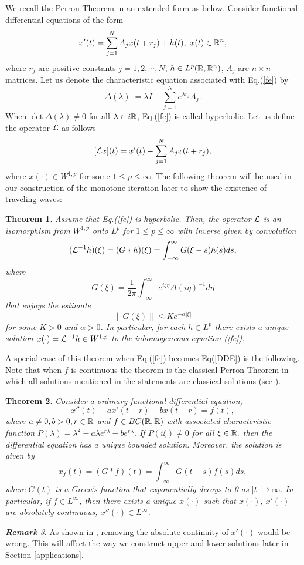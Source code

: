 \documentclass[12pt,letterpaper]{amsart}
\newtheorem{theorem}{Theorem}[section]
\theoremstyle{definition}
\theoremstyle{remark}
\newtheorem{remark}[theorem]{{\bf Remark}}
\numberwithin{equation}{section}
\begin{document}
\medskip
We recall the Perron Theorem in an extended form as below. Consider functional differential equations of the form
\begin{equation}\label{fe}
x'(t)=\sum_{j=1}^N A_jx(t+r_j)+h(t), \ x(t)\in \R^n,
\end{equation}
where $r_j$ are positive constants $j=1,2,\cdots, N$, $h\in L^p(\R,\R^n)$, $A_j$ are $n\times n$-matrices. Let us denote the characteristic equation associated with Eq.(\ref{fe}) by
$$
\Delta (\lambda ):= \lambda I - \sum_{j=1}^N e^{\lambda r_j}A_j.
$$
When $\det \Delta (\lambda )\not =0$ for all $\lambda \in i\R$, Eq.(\ref{fe}) is called hyperbolic. Let us define the operator ${\cal L}$ as follows
$$
[{\cal L} x ](t) = x'(t)- \sum_{j=1}^N A_jx(t+r_j),
$$
where $x(\cdot )\in W^{1,p}$ for some $1\le p\le \infty$. The following theorem will be used in our construction of the monotone iteration later to show the existence of traveling waves:
\begin{theorem}\label{the per} 
Assume that Eq.(\ref{fe}) is hyperbolic. Then, the operator ${\cal L}$ is an isomorphism from $W^{1,p}$ onto $L^p$ for $1\le p\le \infty$ with inverse given by convolution
$$
({\cal L}^{-1}h)(\xi) =(G*h)(\xi ) =\int^\infty_{-\infty} G(\xi -s)h(s )ds,
$$
where
$$
G(\xi) =\frac{1}{2\pi} \int^\infty_{-\infty} e^{i\xi\eta}\Delta (i\eta)^{-1} d\eta 
$$
that enjoys the estimate
$$
\| G(\xi )\| \le Ke^{-\alpha |\xi|}
$$
for some $K>0$ and $\alpha >0$. In particular, for each $h\in L^p$ there exists a unique solution $x(\cdot )={\cal L}^{-1} h \in W^{1,p}$ to the inhomogeneous equation (\ref{fe}).
\end{theorem}
A special case of this theorem when Eq.(\ref{fe}) becomes Eq(\ref{DDE}) is the following. Note that when $f$ is continuous the theorem is the classical Perron Theorem in which all solutions mentioned in the statements are classical solutions (see \cite{murnaimin,pru}).

\begin{theorem}\label{the per2}
Consider a ordinary functional differential equation, 
\begin{equation}
x''(t)-ax'(t+r)-bx(t+r)=f(t), 
\end{equation}
where $a\not=0,b>0, r\in \R$ and $f\in BC (\R ,\R)$ with associated characteristic function $P (\lambda)=\lambda^2-a\lambda e^{r\lambda}-be^{r\lambda}.$ If $ P (i\xi)\neq 0$ for all $\xi\in \R,$ then the differential equation has a unique bounded solution. Moreover, the solution
is given by 
\[x_{f}(t)=(G\ast f)(t)=\int_{-\infty}^{\infty}G(t-s)f(s)ds,\]
where $G(t)$ is a Green's function that exponentially decays to 0 as $|t|\to \infty.$ In particular, if $f\in L^\infty$, then there exists a unique $x(\cdot )$ such that $x(\cdot )$, $x'(\cdot )$ are absolutely continuous, $x''(\cdot )\in L^\infty$.
\end{theorem}
\begin{remark}
As shown in \cite{boumin}, removing the absolute continuity of $x'(\cdot)$ would be wrong. This will affect the way we construct upper and lower solutions later in Section \ref{applications}.
\end{remark}
\end{document}
